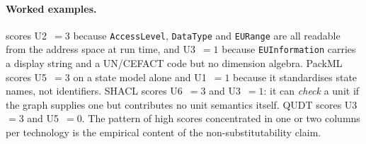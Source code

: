 \paragraph{Worked examples.}
\opcua{} scores U2~$=3$ because \texttt{AccessLevel}, \texttt{DataType} and
\texttt{EURange} are all readable from the address space at run time, and
U3~$=1$ because \texttt{EUInformation} carries a display string and a
UN/CEFACT code but no dimension algebra. PackML scores U5~$=3$ on a state model
alone and U1~$=1$ because it standardises state names, not identifiers.
SHACL scores U6~$=3$ and U3~$=1$: it can \emph{check} a unit if the graph
supplies one but contributes no unit semantics itself. QUDT scores U3~$=3$ and
U5~$=0$. The pattern of high scores concentrated in one or two columns per
technology is the empirical content of the non-substitutability claim.

\clearpage
